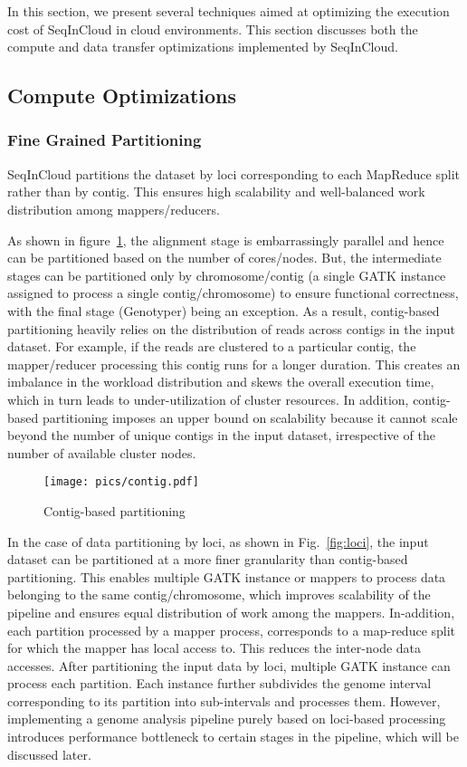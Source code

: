 In this section, we present several techniques aimed at optimizing the execution cost of SeqInCloud in cloud environments. This section discusses both the compute and data transfer optimizations implemented by SeqInCloud.

\subsection{Compute Optimizations}

\subsubsection{Fine Grained Partitioning}

SeqInCloud partitions the dataset by loci corresponding to each MapReduce split rather than by contig. This ensures high scalability and well-balanced work distribution among mappers/reducers. 

As shown in figure~\ref{fig:contig}, the alignment stage is embarrassingly parallel and hence can be partitioned based on the number of cores/nodes. But, the intermediate stages can be partitioned only by chromosome/contig (a single GATK instance assigned to process a single contig/chromosome) to ensure functional correctness, with the final stage (Genotyper) being an exception. As a result, contig-based partitioning heavily relies on the distribution of reads across contigs in the input dataset. For example, if the reads are clustered to a particular contig, the mapper/reducer processing this contig runs for a longer duration. This creates an imbalance in the workload distribution and skews the overall execution time, which in turn leads to under-utilization of cluster resources. In addition, contig-based partitioning imposes an upper bound on scalability because it cannot scale beyond the number of unique contigs in the input dataset, irrespective of the number of available cluster nodes. 

\begin{figure}[!htb]
  \centering
  \texttt{[image: pics/contig.pdf]}
  \caption{Contig-based partitioning}
  \label{fig:contig}
\end{figure}

In the case of data partitioning by loci, as shown in Fig.~\ref{fig:loci}, the input dataset can be partitioned at a more finer granularity than contig-based partitioning. This enables multiple GATK instance or mappers to process data belonging to the same contig/chromosome, which improves scalability of the pipeline and ensures equal distribution of work among the mappers. In-addition, each partition processed by a mapper process, corresponds to a map-reduce split for which the mapper has local access to. This reduces the inter-node data accesses. After partitioning the input data by loci, multiple GATK instance can process each partition. Each instance further subdivides the genome interval corresponding to its partition into sub-intervals and processes them. However, implementing a genome analysis pipeline purely based on loci-based processing introduces performance bottleneck to certain stages in the pipeline, which will be discussed later.

